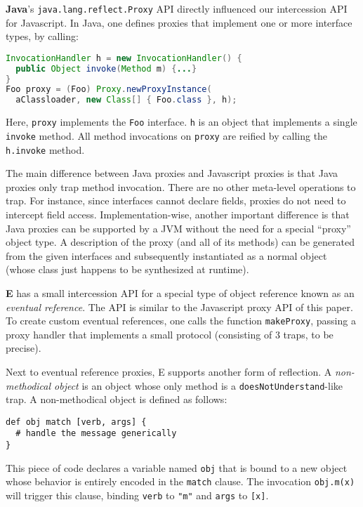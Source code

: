 \documentclass{acm_proc_article-sp}
\begin{document}
\textbf{Java}'s \texttt{java.lang.reflect.Proxy} API directly influenced our intercession API for Javascript. In Java, one defines proxies that implement one or more interface types, by calling:

\begin{lstlisting}[language=java]
InvocationHandler h = new InvocationHandler() {
  public Object invoke(Method m) {...}
}
Foo proxy = (Foo) Proxy.newProxyInstance(
  aClassloader, new Class[] { Foo.class }, h);
\end{lstlisting}

Here, \texttt{proxy} implements the \texttt{Foo} interface. \texttt{h} is an object that implements a single \texttt{invoke} method. All method invocations on \texttt{proxy} are reified by calling the \texttt{h.invoke} method.

The main difference between Java proxies and Javascript proxies is that Java proxies only trap method invocation. There are no other meta-level operations to trap. For instance, since interfaces cannot declare fields, proxies do not need to intercept field access. Implementation-wise, another important difference is that Java proxies can be supported by a JVM without the need for a special ``proxy'' object type. A description of the proxy (and all of its methods) can be generated from the given interfaces and subsequently instantiated as a normal object (whose class just happens to be synthesized at runtime).

\textbf{E} has a small intercession API for a special type of object reference known as an \emph{eventual reference}. The API is similar to the Javascript proxy API of this paper. To create custom eventual references, one calls the function \texttt{makeProxy}, passing a proxy handler that implements a small protocol (consisting of 3 traps, to be precise).

Next to eventual reference proxies, E supports another form of reflection. A \emph{non-methodical object} is an object whose only method is a \texttt{doesNotUnderstand}-like trap. A non-methodical object is defined as follows:

\begin{lstlisting}
def obj match [verb, args] {
  # handle the message generically
}
\end{lstlisting}

This piece of code declares a variable named \texttt{obj} that is bound to a new object whose behavior is entirely encoded in the \texttt{match} clause. The invocation \texttt{obj.m(x)} will trigger this clause, binding \texttt{verb} to \texttt{"m"} and \texttt{args} to \texttt{[x]}.
\end{document}
